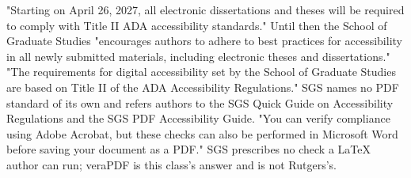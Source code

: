 %
%
	{"Starting on April 26, 2027, all electronic dissertations and theses will
	 be required to comply with Title II ADA accessibility standards." Until
	 then the School of Graduate Studies "encourages authors to adhere to best
	 practices for accessibility in all newly submitted materials, including
	 electronic theses and dissertations."}
	{"The requirements for digital accessibility set by the School of Graduate
	 Studies are based on Title II of the ADA Accessibility Regulations." SGS
	 names no PDF standard of its own and refers authors to the SGS Quick Guide
	 on Accessibility Regulations and the SGS PDF Accessibility Guide.}
	{"You can verify compliance using Adobe Acrobat, but these checks can also
	 be performed in Microsoft Word before saving your document as a PDF."
	 SGS prescribes no check a LaTeX author can run; veraPDF is this class's
	 answer and is not Rutgers's.}

